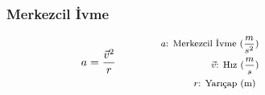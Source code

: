 \subsubsection*{Merkezcil İvme}
\begin{equation}
    a = \frac{\vec{v}^2}{r} \qquad \qquad \parbox{5.5cm}{\footnotesize$\begin{aligned}
        a\text{: Merkezcil İvme } (\frac{m}{s^2}) \\
        \vec{v}\text{: Hız } (\frac{m}{s}) \\
        r\text{: Yarıçap (m) }
\end{aligned}$}
\end{equation}
